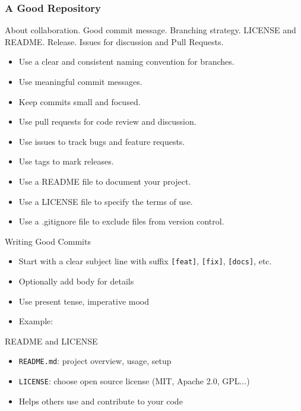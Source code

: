 \documentclass[12pt]{beamer}
\begin{document}
\begin{frame}
  \frametitle{A Good Repository}
  About collaboration.
  Good commit message.
  Branching strategy.
  LICENSE and README.
  Release.
  Issues for discussion and Pull Requests.
  \begin{itemize}
    \item Use a clear and consistent naming convention for branches.
    \item Use meaningful commit messages.
    \item Keep commits small and focused.
    \item Use pull requests for code review and discussion.
    \item Use issues to track bugs and feature requests.
    \item Use tags to mark releases.
    \item Use a README file to document your project.
    \item Use a LICENSE file to specify the terms of use.
    \item Use a .gitignore file to exclude files from version control.
  \end{itemize}
\end{frame}


\begin{frame}{Writing Good Commits}
  \begin{itemize}
    \item Start with a clear subject line with suffix \texttt{[feat]}, \texttt{[fix]}, \texttt{[docs]}, etc.
    \item Optionally add body for details
    \item Use present tense, imperative mood
    \item Example: \texttt{}
  \end{itemize}
\end{frame}

\begin{frame}{README and LICENSE}
  \begin{itemize}
    \item \texttt{README.md}: project overview, usage, setup
    \item \texttt{LICENSE}: choose open source license (MIT, Apache 2.0, GPL...)
    \item Helps others use and contribute to your code
  \end{itemize}
\end{frame}
\end{document}
